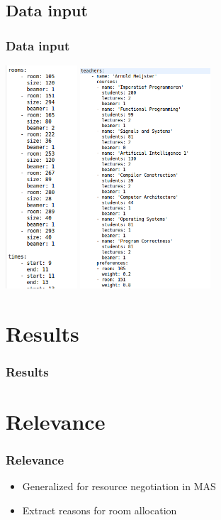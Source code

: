 \documentclass{beamer}
\begin{document}
\subsection{Data input}
\begin{frame}
	\frametitle{Data input}
	\center{}
	\includegraphics[width=0.2\textwidth]{Rooms.png}%
	\includegraphics[width=0.365\textwidth]{Teachers.png}
\end{frame}

\section{Results}
\begin{frame}
	\frametitle{Results}
\end{frame}

\section{Relevance}
\begin{frame}
	\frametitle{Relevance}
        \begin{itemize}[<+->]
            \item Generalized for resource negotiation in MAS
            \item Extract reasons for room allocation
        \end{itemize}
\end{frame}

\end{document}
